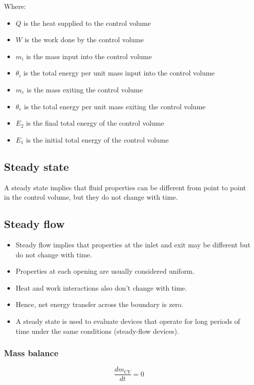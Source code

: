 \documentclass[11pt]{article}
\begin{document}
Where:
\begin{itemize}
\item \(Q\) is the heat supplied to the control volume
\item \(W\) is the work done by the control volume
\item \(m_i\) is the mass input into the control volume
\item \(\theta_i\) is the total energy per unit mass input into the control volume
\item \(m_e\) is the mass exiting the control volume
\item \(\theta_e\) is the total energy per unit mass exiting the control volume
\item \(E_2\) is the final total energy of the control volume
\item \(E_1\) is the initial total energy of the control volume
\end{itemize}

\subsection{Steady state}
\label{sec:org80a4791}
A steady state implies that fluid properties can be different from point to point in the control volume, but they do not change with time.

\subsection{Steady flow}
\label{sec:orgd73d605}
\begin{itemize}
\item Steady flow implies that properties at the inlet and exit may be different but do not change with time.
\item Properties at each opening are usually considered uniform.
\item Heat and work interactions also don't change with time.
\item Hence, net energy transfer across the boundary is zero.
\item A steady state is used to evaluate devices that operate for long periods of time under the same conditions (steady-flow devices).
\end{itemize}

\subsubsection{Mass balance}
\label{sec:orge459be9}
\[\frac{dm_{CV}}{dt} = 0\]
\end{document}
